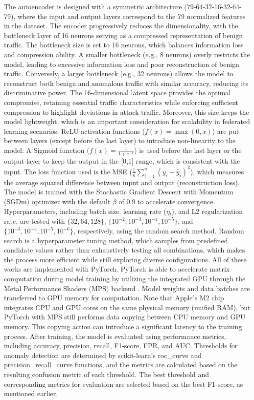 The autoencoder is designed with a symmetric architecture (79-64-32-16-32-64-79), where the input and output layers correspond to the 79 normalized features in the dataset. The encoder progressively reduces the dimensionality, with the bottleneck layer of 16 neurons serving as a compressed representation of benign traffic. The bottleneck size is set to 16 neurons, which balances information loss and compression ability. A smaller bottleneck (e.g., 8 neurons) overly restricts the model, leading to excessive information loss and poor reconstruction of benign traffic. Conversely, a larger bottleneck (e.g., 32 neurons) allows the model to reconstruct both benign and anomalous traffic with similar accuracy, reducing its discriminative power. The 16-dimensional latent space provides the optimal compromise, retaining essential traffic characteristics while enforcing sufficient compression to highlight deviations in attack traffic. Moreover, this size keeps the model lightweight, which is an important consideration for scalability in federated learning scenarios. ReLU activation functions ($f(x) = \max(0, x)$) are put between layers (except before the last layer) to introduce non-linearity to the model. A Sigmoid function ($f(x) = \frac{1}{1 + e^{-x}}$) is used before the last layer or the output layer to keep the output in the [0,1] range, which is consistent with the input. The loss function used is the MSE ($\frac{1}{n} \sum_{i=1}^{n} \left( y_i - \hat{y}_i \right)^2$), which measures the average squared difference between input and output (reconstruction loss). The model is trained with the Stochastic Gradient Descent with Momentum (SGDm) optimizer with the default $\beta$ of 0.9 to accelerate convergence. Hyperparameters, including batch size, learning rate ($\eta_l$), and L2 regularization rate, are tested with $\{32, 64, 128\}$, $\{10^{-2}, 10^{-3}, 10^{-4}, 10^{-5}\}$, and $\{10^{-3}, 10^{-4}, 10^{-5}, 10^{-6}\}$, respectively, using the random search method. Random search is a hyperparameter tuning method, which samples from predefined candidate values rather than exhaustively testing all combinations, which makes the process more efficient while still exploring diverse configurations. All of these works are implemented with PyTorch. PyTorch is able to accelerate matrix computation during model training by utilizing the integrated GPU through the Metal Performance Shaders (MPS) backend \citep{mps}. Model weights and data batches are transferred to GPU memory for computation. Note that Apple's M2 chip integrates CPU and GPU cores on the same physical memory (unified RAM), but PyTorch with MPS still performs data copying between CPU memory and GPU memory. This copying action can introduce a significant latency to the training process. After training, the model is evaluated using performance metrics, including accuracy, precision, recall, F1-score, FPR, and AUC. Thresholds for anomaly detection are determined by scikit-learn’s roc\_curve \citep{sklearnrc} and precision\_recall\_curve \citep{sklearnprc} functions, and the metrics are calculated based on the resulting confusion metric of each threshold. The best threshold and corresponding metrics for evaluation are selected based on the best F1-score, as mentioned earlier.

